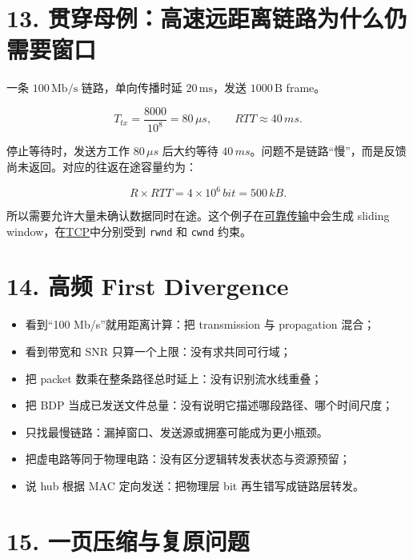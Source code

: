 \documentclass[UTF8,fontset=none,11pt,a4paper]{ctexart}
\providecommand{\tightlist}{\setlength{\itemsep}{0pt}\setlength{\parskip}{0pt}}
\providecommand{\passthrough}[1]{#1}
\begin{document}
\section{13.
贯穿母例：高速远距离链路为什么仍需要窗口}\label{10-ux8d2fux7a7fux6bcdux4f8bux9ad8ux901fux8fdcux8dddux79bbux94feux8defux4e3aux4ec0ux4e48ux4ecdux9700ux8981ux7a97ux53e3}

一条 \(100\,\mathrm{Mb/s}\) 链路，单向传播时延 \(20\,\mathrm{ms}\)，发送
\(1000\,\mathrm{B}\) frame。

\[
T_{tx}=\frac{8000}{10^8}=80\,\mu s,
\qquad
RTT\approx40\,ms.
\]

停止等待时，发送方工作 \(80\,\mu s\) 后大约等待
\(40\,ms\)。问题不是链路``慢''，而是反馈尚未返回。对应的往返在途容量约为：

\[
R\times RTT=4\times10^6\,bit=500\,kB.
\]

所以需要允许大量未确认数据同时在途。这个例子在\href{../03_可靠传输_序号_ACK_定时器与滑动窗口/README.md}{可靠传输}中会生成
sliding
window，在\href{../06_传输层_端点_UDP与TCP状态机/README.md}{TCP}中分别受到
\passthrough{\lstinline!rwnd!} 和 \passthrough{\lstinline!cwnd!} 约束。

\section{14. 高频 First
Divergence}\label{11-ux9ad8ux9891-first-divergence}

\begin{itemize}
\tightlist
\item
  看到``100 Mb/s''就用距离计算：把 transmission 与 propagation 混合；
\item
  看到带宽和 SNR 只算一个上限：没有求共同可行域；
\item
  把 packet 数乘在整条路径总时延上：没有识别流水线重叠；
\item
  把 BDP 当成已发送文件总量：没有说明它描述哪段路径、哪个时间尺度；
\item
  只找最慢链路：漏掉窗口、发送源或拥塞可能成为更小瓶颈。
\item
  把虚电路等同于物理电路：没有区分逻辑转发表状态与资源预留；
\item
  说 hub 根据 MAC 定向发送：把物理层 bit 再生错写成链路层转发。
\end{itemize}

\section{15.
一页压缩与复原问题}\label{12-ux4e00ux9875ux538bux7f29ux4e0eux590dux539fux95eeux9898}
\end{document}
